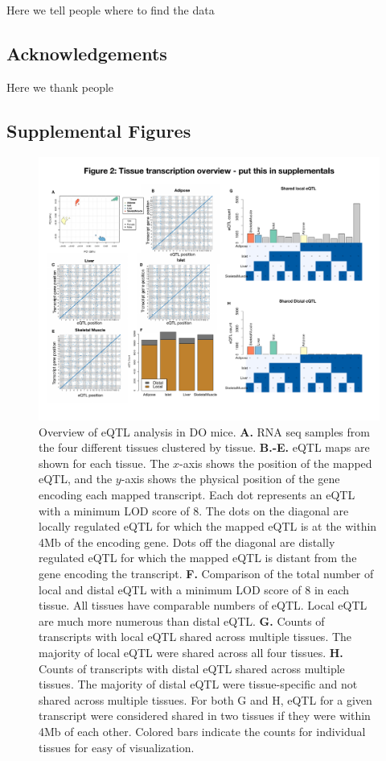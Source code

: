 \documentclass[
]{article}
\begin{document}
Here we tell people where to find the data

\subsection{Acknowledgements}\label{acknowledgements}

Here we thank people

\pagebreak

\subsection{Supplemental Figures}\label{supplemental-figures}

\begin{figure}[ht!]
\includegraphics[width=\textwidth]{Figures/Supp_Fig1_eQTL.pdf} 
\caption{Overview of eQTL analysis in DO mice. \textbf{A.} RNA seq 
samples from the four different tissues clustered by tissue. 
\textbf{B.-E.} eQTL maps are shown for each tissue. The $x$-axis 
shows the position of the mapped eQTL, and the $y$-axis shows the 
physical position of the gene encoding each mapped transcript. 
Each dot represents an eQTL with a minimum LOD score of 8. The dots 
on the diagonal are locally regulated eQTL for which the mapped eQTL 
is at the within 4Mb of the encoding gene. Dots off the diagonal are 
distally regulated eQTL for which the mapped eQTL is distant from the 
gene encoding the transcript. \textbf{F.} Comparison of the total number 
of local and distal eQTL with a minimum LOD score of 8 in each tissue. 
All tissues have comparable numbers of eQTL. Local eQTL are much more 
numerous than distal eQTL. \textbf{G.} Counts of transcripts with local 
eQTL shared across multiple tissues. The majority of local eQTL were 
shared across all four tissues. \textbf{H.} Counts of transcripts with 
distal eQTL shared across multiple tissues. The majority of distal eQTL 
were tissue-specific and not shared across multiple tissues. For both G 
and H, eQTL for a given transcript were considered shared in two tissues 
if they were within 4Mb of each other. Colored bars indicate the counts 
for individual tissues for easy of visualization.
}
\label{fig:eQTL}
\end{figure}
\end{document}
